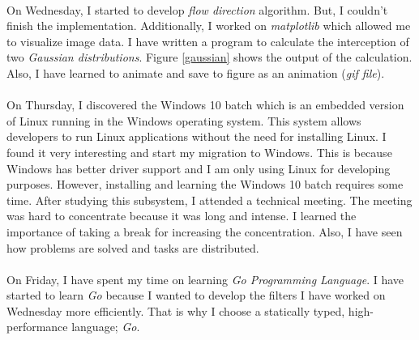 \documentclass{article}
\begin{document}
    \paragraph{}
        On Wednesday, I started to develop \textit{flow direction} algorithm. But, I couldn't finish the implementation. Additionally, I worked on \textit{matplotlib} which allowed me to visualize image data. I have written a program to calculate the interception of two \textit{Gaussian distributions}. Figure \ref{gaussian} shows the output of the calculation. Also, I have learned to animate and save to figure as an animation (\textit{gif file}).

    \paragraph{}
        On Thursday, I discovered the Windows 10 batch which is an embedded version of Linux running in the Windows operating system. This system allows developers to run Linux applications without the need for installing Linux. I found it very interesting and start my migration to Windows. This is because Windows has better driver support and I am only using Linux for developing purposes. However, installing and learning the Windows 10 batch requires some time. After studying this subsystem, I attended a technical meeting. The meeting was hard to concentrate because it was long and intense. I learned the importance of taking a break for increasing the concentration. Also, I have seen how problems are solved and tasks are distributed.

    \paragraph{}
        On Friday, I have spent my time on learning \textit{Go Programming Language}. I have started to learn \textit{Go} because I wanted to develop the filters I have worked on Wednesday more efficiently. That is why I choose a statically typed, high-performance language; \textit{Go}.
    
\end{document}
